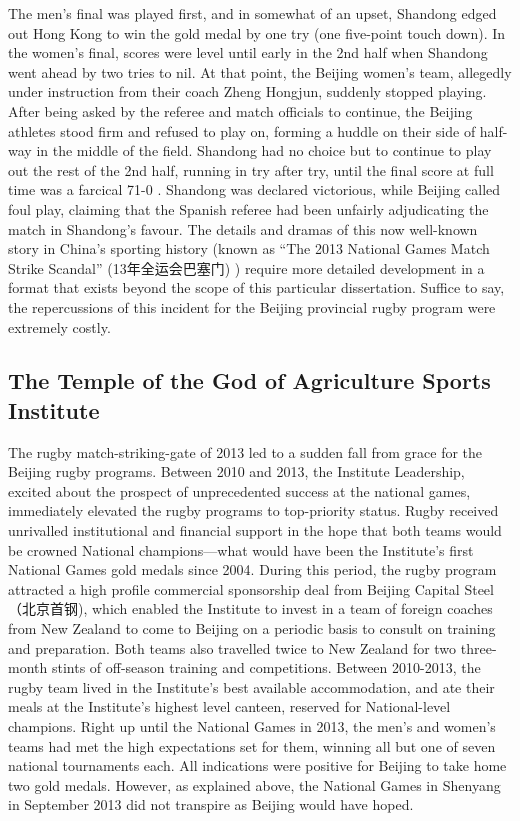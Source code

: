 \begin{CJK}{UTF8}{gbsn}
The men's final was played first, and in somewhat of an upset, Shandong edged out Hong Kong to win the gold medal by one try (one five-point touch down).  In the women's final, scores were level until early in the 2nd half when Shandong went ahead by two tries to nil.  At that point, the Beijing women's team, allegedly under instruction from their coach Zheng Hongjun, suddenly stopped playing.  After being asked by the referee and match officials to continue, the Beijing athletes stood firm and refused to play on, forming a huddle on their side of half-way in the middle of the field. Shandong had no choice but to continue to play out the rest of the 2nd half, running in try after try, until the final score at full time was a farcical 71-0 \citep{Sina2013}.  Shandong was declared victorious, while Beijing called foul play, claiming that the Spanish referee had been unfairly adjudicating the match in Shandong's favour.  The details and dramas of this now well-known story in China's sporting history (known as ``The 2013 National Games Match Strike Scandal'' (13年全运会巴塞门) ) require more detailed development in a format that exists beyond the scope of this particular dissertation.  Suffice to say, the repercussions of this incident for the Beijing provincial rugby program were extremely costly.

\subsection{The Temple of the God of Agriculture Sports Institute}
The rugby match-striking-gate of 2013 led to a sudden fall from grace for the Beijing rugby programs.  Between 2010 and 2013, the Institute Leadership, excited about the prospect of unprecedented success at the national games,  immediately elevated the rugby programs to top-priority status.  Rugby received unrivalled institutional and financial support in the hope that both teams would be crowned National champions---what would have been the Institute's first National Games gold medals since 2004.  During this period, the rugby program attracted a high profile commercial sponsorship deal from Beijing Capital Steel（北京首钢), which enabled the Institute to invest in a team of foreign coaches from New Zealand to come to Beijing on a periodic basis to consult on training and preparation. Both teams also travelled twice to New Zealand for two three-month stints of off-season training and competitions.  Between 2010-2013, the rugby team lived in the Institute's best available accommodation, and ate their meals at the Institute's highest level canteen, reserved for National-level champions.  Right up until the National Games in 2013, the men's and women's teams had met the high expectations set for them, winning all but one of seven national tournaments each.  All indications were positive for Beijing to take home two gold medals.  However, as explained above, the National Games in Shenyang in September 2013 did not transpire as Beijing would have hoped.


\end{CJK}
